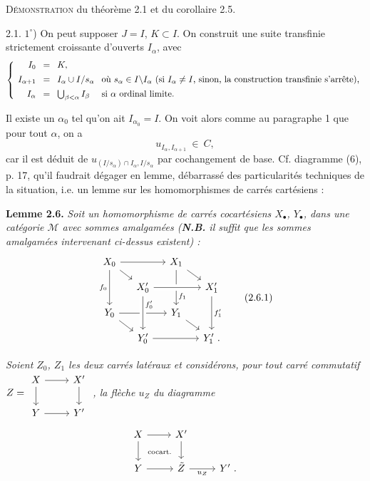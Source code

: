 \documentclass[11pt]{article}
\newcommand{\printedpage}[1]{\marginpar{\footnotesize p.~#1}}
\newcommand{\msp}[1]{\marginpar{\footnotesize [#1]}}
\newcommand{\M}{\mathcal{M}}
\begin{document}
\printedpage{17}

\msp{page 30}

\textsc{Démonstration} du théorème 2.1 et du corollaire 2.5.

2.1. $1^\circ$) On peut supposer $J = I$, $K \subset I$. On construit une suite transfinie strictement croissante d'ouverts $I_\alpha$, avec
\[
\left\{
\setlength{\arraycolsep}{4pt}
\begin{array}{rcll}
I_0 & = & K, & \\[1ex]
I_{\alpha+1} & = & I_\alpha \cup I/s_\alpha & \text{où } s_\alpha \in I\backslash I_\alpha \text{ (si } I_\alpha \neq I\text{, sinon, la construction transfinie s'arrête),}\\[1ex]
I_\alpha & = & \bigcup_{\beta<\alpha} I_\beta & \text{si } \alpha \text{ ordinal limite.}
\end{array}
\right.
\]

Il existe un $\alpha_0$ tel qu'on ait $I_{\alpha_0} = I$. On voit alors comme au paragraphe 1
\msp{page 31}
que pour tout $\alpha$, on a
\[
u_{I_\alpha,I_{\alpha+1}} \ \in\ C,
\tag*{$(*)$}
\]
car il est déduit de $u_{(I/s_\alpha)\cap I_\alpha,I/s_\alpha}$ par cochangement de base. Cf. diagramme (6), p. 17, qu'il faudrait dégager en lemme, débarrassé des particularités techniques de la situation, i.e. un lemme sur les homomorphismes de carrés cartésiens :

\textbf{Lemme 2.6.} \textit{Soit un homomorphisme de carrés cocartésiens $X_\bullet$, $Y_\bullet$, dans une catégorie $\M$ avec sommes amalgamées (\textbf{N.B.} il suffit que les sommes amalgamées intervenant ci-dessus existent) :}
\[
\begin{tikzcd}[row sep=small, column sep=small]
X_0 \arrow[rr] \arrow[dr] \arrow[dd, "f_0"'] & & X_1 \arrow[dr] \arrow[dd, "f_1" near end] & \\
 & X'_0 \arrow[rr, crossing over] & & X'_1 \arrow[dd, "f'_1"] \\
Y_0 \arrow[rr] \arrow[dr] & & Y_1 \arrow[dr] & \\
 & Y'_0 \arrow[rr] \arrow[from=uu, crossing over, "f'_0" near start] & & Y'_1 \ .
\end{tikzcd}
\tag*{(2.6.1)}
\]

\textit{Soient $Z_0$, $Z_1$ les deux carrés latéraux et considérons, pour tout carré commutatif}
$Z = \begin{tikzcd}[ampersand replacement=\&, baseline=(\tikzcdmatrixname.center)]
X \arrow[r] \arrow[d] \& X' \arrow[d] \\
Y \arrow[r] \& Y'
\end{tikzcd}$ \textit{, la flèche $u_Z$ du diagramme}
\[
\begin{tikzcd}
X \arrow[r] \arrow[d] \arrow[dr, phantom, "\text{\scriptsize cocart.}"] & X' \arrow[d] & \\
Y \arrow[r] & \tilde{Z} \arrow[r, "u_Z"'] & Y' \ .
\end{tikzcd}
\]
\end{document}
